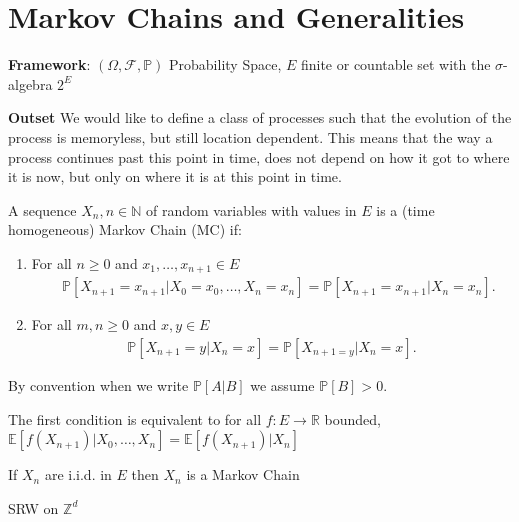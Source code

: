 \chapter{Markov Chains and Generalities}

\textbf{Framework}: $(\Omega, \mathcal{F}, \mathbb{P})$ Probability Space, $E$ finite or countable set with the $\sigma$-algebra $2^E$

\noindent
\textbf{Outset} We would like to define a class of processes such that the evolution of the process is memoryless, but still location dependent. This means that the way a process continues past this point in time, does not depend on how it got to where it is now, but only on where it is at this point in time. 

\begin{defn}
	A sequence $X_n, n \in \mathbb{N}$ of random variables with values in $E$ is a (time homogeneous) Markov Chain (MC) if:
\begin{enumerate}
	\item  For all $n \geq 0$ and $x_1,\ldots,x_{n+1} \in E$
\begin{align}
	\quad \boxed{\mathbb{P} \left[ X_{n+1}=x_{n+1} | X_0=x_0,\ldots,X_n=x_n \right] = \mathbb{P} \left[ X_{n+1}=x_{n+1} | X_n = x_n \right]}
.\end{align}
	\item For all $m,n \geq 0$ and $x,y \in E$
\begin{align}	
	\boxed{\mathbb{P} \left[ X_{n+1}=y | X_{n}=x \right] = \mathbb{P} \left[ X_{n+1=y}| X_n=x \right]} 
.\end{align}
\end{enumerate}

\end{defn}


By convention when we write $\mathbb{P} \left[ A|B \right] $ we assume $\mathbb{P} \left[ B \right] >0$.

\begin{rmk}
The first condition is equivalent to for all $f:E\to \mathbb{R}$ bounded, $\mathbb{E} \left[ f(X_{n+1}) | X_0,\ldots,X_n \right] = \mathbb{E} \left[ f(X_{n+1}) | X_n \right] $
\end{rmk}

\begin{ex}
	If $X_n$ are i.i.d. in $E$ then $X_n$ is a Markov Chain
\end{ex}

\begin{ex}
	SRW on $\mathbb{Z}^d$
\end{ex}

